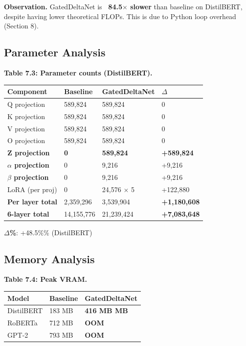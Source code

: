 \textbf{Observation.} GatedDeltaNet is \textbf{~84.5$\times$ slower} than baseline 
on DistilBERT, despite having lower theoretical FLOPs. This is due to Python 
loop overhead (Section 8).

\subsection{Parameter Analysis}

\textbf{Table 7.3: Parameter counts (DistilBERT).}

\begin{table}[H]
\centering
\small
\begin{tabular}{llll}
\toprule
\textbf{Component} & \textbf{Baseline} & \textbf{GatedDeltaNet} & \textbf{$\Delta$} \\
\midrule
Q projection & 589,824 & 589,824 & 0 \\
K projection & 589,824 & 589,824 & 0 \\
V projection & 589,824 & 589,824 & 0 \\
O projection & 589,824 & 589,824 & 0 \\
\textbf{Z projection} & \textbf{0} & \textbf{589,824} & \textbf{+589,824} \\
\textbf{$\alpha$ projection} & 0 & 9,216 & +9,216 \\
\textbf{$\beta$ projection} & 0 & 9,216 & +9,216 \\
LoRA (per proj) & 0 & 24,576 $\times$ 5 & +122,880 \\
\textbf{Per layer total} & 2,359,296 & 3,539,904 & \textbf{+1,180,608} \\
\textbf{6-layer total} & 14,155,776 & 21,239,424 & \textbf{+7,083,648} \\
\bottomrule
\end{tabular}
\end{table}

\textbf{$\Delta$\%}: +48.5\%\% (DistilBERT)

\subsection{Memory Analysis}

\textbf{Table 7.4: Peak VRAM.}

\begin{table}[H]
\centering
\small
\begin{tabular}{lll}
\toprule
\textbf{Model} & \textbf{Baseline} & \textbf{GatedDeltaNet} \\
\midrule
DistilBERT & 183 MB & \textbf{416 MB MB} \\
RoBERTa & 712 MB & \textbf{OOM} \\
GPT-2 & 793 MB & \textbf{OOM} \\
\bottomrule
\end{tabular}
\end{table}

